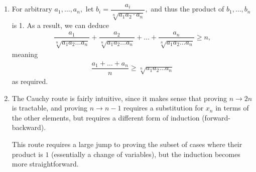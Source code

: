 \documentclass[12pt]{article}
\begin{document}
\begin{enumerate}
\begin{enumerate}
      \item For arbitrary $a_1, \ldots, a_n,$ let $b_i =
        \dfrac{a_i}{\sqrt[n]{a_1 a_2 \cdot a_n}},$ and thus the
        product of $b_1, \ldots, b_n$ is 1. As a result, we can deduce
        \begin{align*}
          \dfrac{a_1}{\sqrt[n]{a_1 a_2 \ldots a_n}} +
          \dfrac{a_2}{\sqrt[n]{a_1 a_2 \ldots a_n}} + \ldots +
          \dfrac{a_n}{\sqrt[n]{a_1 a_2 \ldots a_n}} \geq n,
        \end{align*}
        meaning
        \begin{align*}
          \dfrac{a_1 + \ldots + a_n}{n} \geq \sqrt[n]{a_1 a_2 \ldots a_n}
        \end{align*}
        as required.

      \item The Cauchy route is fairly intuitive, since it makes
        sense that proving $n \to 2n$ is tractable, and proving $n
        \to n - 1$ requires a substitution for $x_n$ in terms of the
        other elements, but requires a different form of induction
        (forward-backward).

        This route requires a large jump to proving the subset of
        cases where their product is $1$ (essentially a change of
        variables), but the induction becomes more straightforward.
    \end{enumerate}
\end{enumerate}
\end{document}

